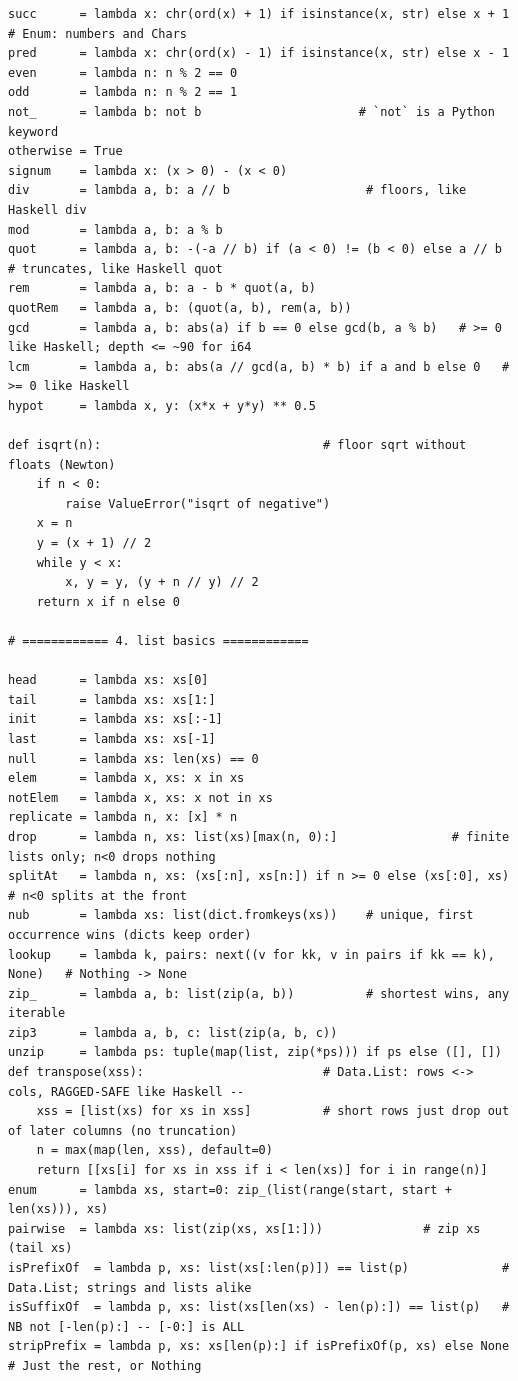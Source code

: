 \documentclass[10pt,letterpaper]{book}
\begin{document}
\begin{lstlisting}[style=file]
succ      = lambda x: chr(ord(x) + 1) if isinstance(x, str) else x + 1   # Enum: numbers and Chars
pred      = lambda x: chr(ord(x) - 1) if isinstance(x, str) else x - 1
even      = lambda n: n % 2 == 0
odd       = lambda n: n % 2 == 1
not_      = lambda b: not b                      # `not` is a Python keyword
otherwise = True
signum    = lambda x: (x > 0) - (x < 0)
div       = lambda a, b: a // b                   # floors, like Haskell div
mod       = lambda a, b: a % b
quot      = lambda a, b: -(-a // b) if (a < 0) != (b < 0) else a // b   # truncates, like Haskell quot
rem       = lambda a, b: a - b * quot(a, b)
quotRem   = lambda a, b: (quot(a, b), rem(a, b))
gcd       = lambda a, b: abs(a) if b == 0 else gcd(b, a % b)   # >= 0 like Haskell; depth <= ~90 for i64
lcm       = lambda a, b: abs(a // gcd(a, b) * b) if a and b else 0   # >= 0 like Haskell
hypot     = lambda x, y: (x*x + y*y) ** 0.5

def isqrt(n):                               # floor sqrt without floats (Newton)
    if n < 0:
        raise ValueError("isqrt of negative")
    x = n
    y = (x + 1) // 2
    while y < x:
        x, y = y, (y + n // y) // 2
    return x if n else 0

# ============ 4. list basics ============

head      = lambda xs: xs[0]
tail      = lambda xs: xs[1:]
init      = lambda xs: xs[:-1]
last      = lambda xs: xs[-1]
null      = lambda xs: len(xs) == 0
elem      = lambda x, xs: x in xs
notElem   = lambda x, xs: x not in xs
replicate = lambda n, x: [x] * n
drop      = lambda n, xs: list(xs)[max(n, 0):]                # finite lists only; n<0 drops nothing
splitAt   = lambda n, xs: (xs[:n], xs[n:]) if n >= 0 else (xs[:0], xs)   # n<0 splits at the front
nub       = lambda xs: list(dict.fromkeys(xs))    # unique, first occurrence wins (dicts keep order)
lookup    = lambda k, pairs: next((v for kk, v in pairs if kk == k), None)   # Nothing -> None
zip_      = lambda a, b: list(zip(a, b))          # shortest wins, any iterable
zip3      = lambda a, b, c: list(zip(a, b, c))
unzip     = lambda ps: tuple(map(list, zip(*ps))) if ps else ([], [])
def transpose(xss):                         # Data.List: rows <-> cols, RAGGED-SAFE like Haskell --
    xss = [list(xs) for xs in xss]          # short rows just drop out of later columns (no truncation)
    n = max(map(len, xss), default=0)
    return [[xs[i] for xs in xss if i < len(xs)] for i in range(n)]
enum      = lambda xs, start=0: zip_(list(range(start, start + len(xs))), xs)
pairwise  = lambda xs: list(zip(xs, xs[1:]))              # zip xs (tail xs)
isPrefixOf  = lambda p, xs: list(xs[:len(p)]) == list(p)             # Data.List; strings and lists alike
isSuffixOf  = lambda p, xs: list(xs[len(xs) - len(p):]) == list(p)   # NB not [-len(p):] -- [-0:] is ALL
stripPrefix = lambda p, xs: xs[len(p):] if isPrefixOf(p, xs) else None  # Just the rest, or Nothing


\end{lstlisting}
\end{document}
